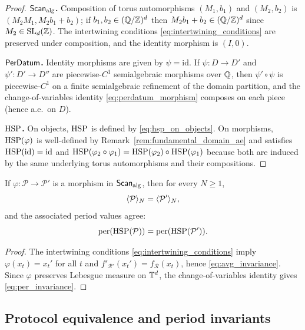 \begin{proof}
\textbf{$\mathsf{Scan}_{\mathrm{alg}}$.} Composition of torus automorphisms $(M_1,b_1)$ and $(M_2,b_2)$ is $(M_2M_1,M_2b_1+b_2)$; if $b_1,b_2\in(\mathbb{Q}/\mathbb{Z})^d$ then $M_2b_1+b_2\in(\mathbb{Q}/\mathbb{Z})^d$ since $M_2\in\mathrm{SL}_d(\mathbb{Z})$. The intertwining conditions \eqref{eq:intertwining_conditions} are preserved under composition, and the identity morphism is $(I,0)$.

\textbf{$\mathsf{PerDatum}$.} Identity morphisms are given by $\psi=\mathrm{id}$. If $\psi:D\to D'$ and $\psi':D'\to D''$ are piecewise-$C^1$ semialgebraic morphisms over $\mathbb{Q}$, then $\psi'\circ\psi$ is piecewise-$C^1$ on a finite semialgebraic refinement of the domain partition, and the change-of-variables identity \eqref{eq:perdatum_morphism} composes on each piece (hence a.e.\ on $D$).

\textbf{$\mathrm{HSP}$.} On objects, $\mathrm{HSP}$ is defined by \eqref{eq:hsp_on_objects}. On morphisms, $\mathrm{HSP}(\varphi)$ is well-defined by Remark~\ref{rem:fundamental_domain_ae} and satisfies $\mathrm{HSP}(\mathrm{id})=\mathrm{id}$ and $\mathrm{HSP}(\varphi_2\circ\varphi_1)=\mathrm{HSP}(\varphi_2)\circ\mathrm{HSP}(\varphi_1)$ because both are induced by the same underlying torus automorphisms and their compositions.
\end{proof}

\begin{proposition}
\label{prop:functorial_invariance}
If $\varphi:\mathcal{P}\to\mathcal{P}'$ is a morphism in $\mathsf{Scan}_{\mathrm{alg}}$, then for every $N\ge 1$,
\begin{equation}
\label{eq:avg_invariance}
\langle \mathcal{P} \rangle_N = \langle \mathcal{P}' \rangle_N,
\end{equation}
and the associated period values agree:
\begin{equation}
\label{eq:per_invariance}
\mathrm{per}(\mathrm{HSP}(\mathcal{P}))=\mathrm{per}(\mathrm{HSP}(\mathcal{P}')).
\end{equation}
\end{proposition}

\begin{proof}
The intertwining conditions \eqref{eq:intertwining_conditions} imply $\varphi(x_t)=x_t'$ for all $t$ and $f'_{\mathcal{R}'}(x_t')=f_{\mathcal{R}}(x_t)$, hence \eqref{eq:avg_invariance}. Since $\varphi$ preserves Lebesgue measure on $\mathbb{T}^d$, the change-of-variables identity gives \eqref{eq:per_invariance}.
\end{proof}

\subsection{Protocol equivalence and period invariants}
\label{sec:protocol_equivalence}

